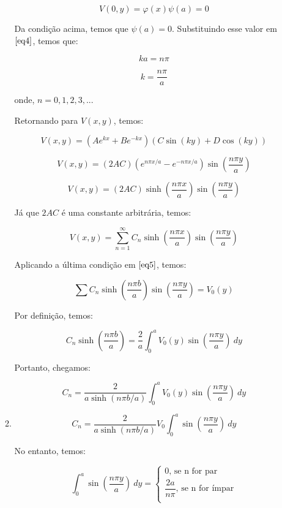 \documentclass[11pt,a4paper]{article}
\begin{document}
\begin{enumerate}
\begin{enumerate}
$$V(0,y) = \varphi (x) \psi (a) = 0$$ 

Da condição acima, temos que $\psi (a) = 0$. Substituindo esse valor em $\ref{eq4}$, temos que:

$$ka = n\pi$$ 

$$k = \displaystyle\dfrac{n\pi}{a}$$ 

onde, $n = 0, 1, 2, 3, ...$

Retornando para $V(x,y)$, temos:

$$V(x,y) = (A e^{kx} + B e^{-kx}) (C \sin(ky) + D \cos(ky))$$

$$V(x,y) = (2AC)(e^{n\pi x/a} - e^{-n\pi x/a}) \sin\left(\displaystyle\dfrac{n\pi y}{a}\right)$$

$$V(x,y) = (2AC)\sinh\left(\displaystyle\dfrac{n\pi x}{a}\right) \sin\left(\displaystyle\dfrac{n\pi y}{a}\right)$$

Já que $2AC$ é uma constante arbitrária, temos:

\begin{equation}
V(x,y) = \displaystyle\sum_{n=1}^\infty C_n \sinh\left(\displaystyle\dfrac{n\pi x}{a}\right) \sin\left(\displaystyle\dfrac{n\pi y}{a}\right) 
\label{eq5}
\end{equation}

Aplicando a última condição em $\ref{eq5}$, temos:

$$\displaystyle\sum C_n \sinh\left(\displaystyle\dfrac{n\pi b}{a}\right) \sin\left(\displaystyle\dfrac{n\pi y}{a}\right) = V_0(y)$$

Por definição, temos:

$$C_n \sinh\left(\displaystyle\dfrac{n\pi b}{a}\right) = \displaystyle\dfrac{2}{a}\displaystyle\int_0^{a} V_0(y) \sin\left(\displaystyle\dfrac{n\pi y}{a}\right) \ dy$$

Portanto, chegamos:

$$C_n = \displaystyle\dfrac{2}{a\sinh(n\pi b/a)}\displaystyle\int_0^{a} V_0(y) \sin\left(\displaystyle\dfrac{n\pi y}{a}\right) \ dy$$

\item

$$C_n = \displaystyle\dfrac{2}{a\sinh(n\pi b/a)}V_0\displaystyle\int_0^{a} \sin\left(\displaystyle\dfrac{n\pi y}{a}\right) \ dy$$

No entanto, temos:

$$\int_0^{a} \sin\left(\displaystyle\dfrac{n\pi y}{a}\right) \ dy = 
		\begin{cases}
			0,\, \textrm{se n for par} \\
			\displaystyle\dfrac{2a}{n\pi},\, \textrm{se n for ímpar} \\
		\end{cases}
	$$
	

\end{enumerate}
\end{enumerate}
\end{document}
